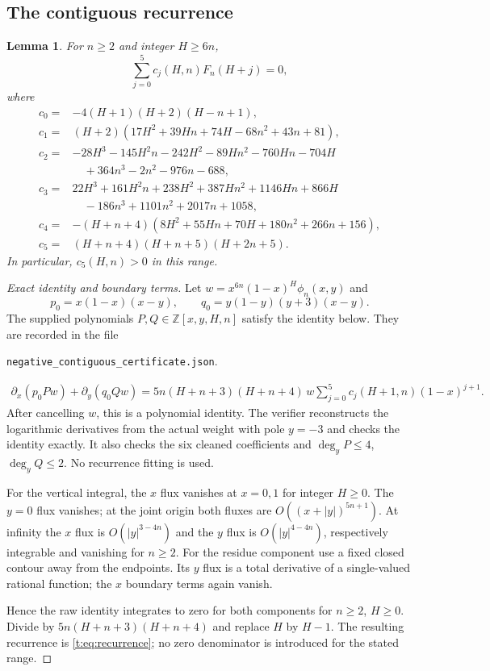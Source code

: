 \documentclass[11pt]{amsart}
\newcommand{\Z}{\mathbb Z}
\theoremstyle{plain}
\newtheorem{lemma}[theorem]{Lemma}
\theoremstyle{remark}\newtheorem{remark}[theorem]{Remark}
\numberwithin{equation}{section}
\begin{document}
\subsection{The contiguous recurrence}\label{t:sec:recurrence}
\begin{lemma}\label{t:lem:recurrence}
For $n\ge2$ and integer $H\ge6n$,
\begin{equation}\label{t:eq:recurrence}
 \sum_{j=0}^{5}c_j(H,n)F_n(H+j)=0,
\end{equation}
where
\begin{align*}
 c_0={}&-4(H+1)(H+2)(H-n+1),\\
 c_1={}&(H+2)(17H^2+39Hn+74H-68n^2+43n+81),\\
 c_2={}&-28H^3-145H^2n-242H^2-89Hn^2-760Hn-704H\\
       &\quad+364n^3-2n^2-976n-688,\\
 c_3={}&22H^3+161H^2n+238H^2+387Hn^2+1146Hn+866H\\
       &\quad-186n^3+1101n^2+2017n+1058,\\
 c_4={}&-(H+n+4)(8H^2+55Hn+70H+180n^2+266n+156),\\
 c_5={}&(H+n+4)(H+n+5)(H+2n+5).
\end{align*}
In particular, $c_5(H,n)>0$ in this range.
\end{lemma}
\begin{proof}[Exact identity and boundary terms]
Let $w=x^{6n}(1-x)^H\phi_n(x,y)$ and
\[
 p_0=x(1-x)(x-y),\qquad q_0=y(1-y)(y+3)(x-y).
\]
The supplied polynomials $P,Q\in\Z[x,y,H,n]$ satisfy the identity below.
They are recorded in the file
\begin{center}\small\texttt{negative\_contiguous\_certificate.json}.\end{center}
\begin{multline}\label{t:eq:telescoper}
 \partial_x(p_0Pw)+\partial_y(q_0Qw)
 =5n(H+n+3)(H+n+4)\,w
 \sum_{j=0}^{5}c_j(H+1,n)(1-x)^{j+1}.
\end{multline}
After cancelling $w$, this is a polynomial identity. The verifier
reconstructs the logarithmic derivatives from the actual weight with pole
$y=-3$ and checks the identity exactly. It also checks the six cleaned
coefficients and $\deg_yP\le4$, $\deg_yQ\le2$. No recurrence fitting is used.

For the vertical integral, the $x$ flux vanishes at $x=0,1$ for integer
$H\ge0$. The $y=0$ flux vanishes; at the joint origin both fluxes are
$O((x+|y|)^{5n+1})$. At infinity the $x$ flux is
$O(|y|^{3-4n})$ and the $y$ flux is $O(|y|^{4-4n})$, respectively
integrable and vanishing for $n\ge2$. For the residue component use a fixed
closed contour away from the endpoints. Its $y$ flux is a total derivative
of a single-valued rational function; the $x$ boundary terms again vanish.

Hence the raw identity integrates to zero for both components for $n\ge2$,
$H\ge0$. Divide by $5n(H+n+3)(H+n+4)$ and replace $H$ by $H-1$.
The resulting recurrence is \eqref{t:eq:recurrence}; no zero denominator is
introduced for the stated range.
\end{proof}
\end{document}
